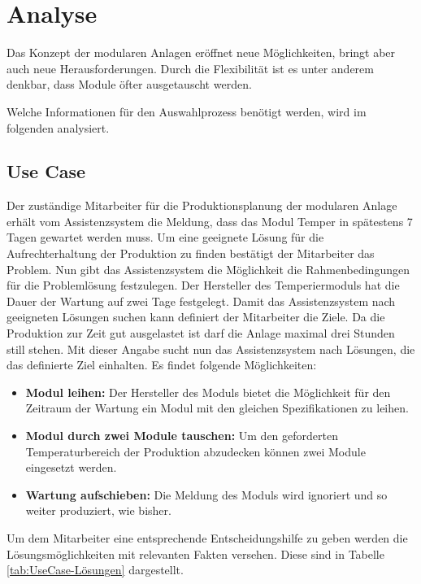 
\chapter{Analyse}
\label{sec:Anforderungsanalyse}
Das Konzept der modularen Anlagen eröffnet neue Möglichkeiten, bringt aber auch neue Herausforderungen. Durch die Flexibilität ist es unter anderem denkbar, dass Module öfter ausgetauscht werden.

Welche Informationen für den Auswahlprozess benötigt werden, wird im folgenden analysiert. 

\section{Use Case}
Der zuständige Mitarbeiter für die Produktionsplanung der modularen Anlage erhält vom Assistenzsystem die Meldung, dass das Modul Temper in spätestens 7 Tagen gewartet werden muss. Um eine geeignete Lösung für die Aufrechterhaltung der Produktion zu finden bestätigt der Mitarbeiter das Problem. Nun gibt das Assistenzsystem die Möglichkeit die Rahmenbedingungen für die Problemlösung festzulegen. Der Hersteller des Temperiermoduls hat die Dauer der Wartung auf zwei Tage festgelegt. Damit das Assistenzsystem nach geeigneten Lösungen suchen kann definiert der Mitarbeiter die Ziele. Da die Produktion zur Zeit gut ausgelastet ist darf die Anlage maximal drei Stunden still stehen. Mit dieser Angabe sucht nun das Assistenzsystem nach Lösungen, die das definierte Ziel einhalten. Es findet folgende Möglichkeiten:
\begin{itemize}
\item \textbf{Modul leihen:} Der Hersteller des Moduls bietet die Möglichkeit für den Zeitraum der Wartung ein Modul mit den gleichen Spezifikationen zu leihen.
\item \textbf{Modul durch zwei Module tauschen:} Um den geforderten Temperaturbereich der Produktion abzudecken können zwei Module eingesetzt werden.
\item \textbf{Wartung aufschieben:} Die Meldung des Moduls wird ignoriert und so weiter produziert, wie bisher.
\end{itemize}
Um dem Mitarbeiter eine entsprechende Entscheidungshilfe zu geben werden die Lösungsmöglichkeiten mit relevanten Fakten versehen. Diese sind in Tabelle \ref{tab:UseCase-Lösungen} dargestellt.

